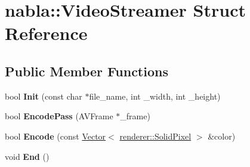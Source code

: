 \hypertarget{structnabla_1_1_video_streamer}{}\section{nabla\+::Video\+Streamer Struct Reference}
\label{structnabla_1_1_video_streamer}
\subsection*{Public Member Functions}
\begin{DoxyCompactItemize}
\item 
\mbox{\label{structnabla_1_1_video_streamer_abe75acee2d79e0b2bfbae9fdb0a595ad}} 
bool {\bfseries Init} (const char $\ast$file\+\_\+name, int \+\_\+width, int \+\_\+height)
\item 
\mbox{\label{structnabla_1_1_video_streamer_a56a14b9f8b148003e209e00b69e6da3d}} 
bool {\bfseries Encode\+Pass} (A\+V\+Frame $\ast$\+\_\+frame)
\item 
\mbox{\label{structnabla_1_1_video_streamer_aa8e09c105d0158efc3dde577526f9d53}} 
bool {\bfseries Encode} (const \mbox{\hyperlink{classnabla_1_1_s_t_l_vector_ex}{Vector}}$<$ \mbox{\hyperlink{structnabla_1_1renderer_1_1_solid_pixel}{renderer\+::\+Solid\+Pixel}} $>$ \&color)
\item 
\mbox{\label{structnabla_1_1_video_streamer_abcd47ba7f90535b199f04deddab4ec08}} 
void {\bfseries End} ()
\end{DoxyCompactItemize}
